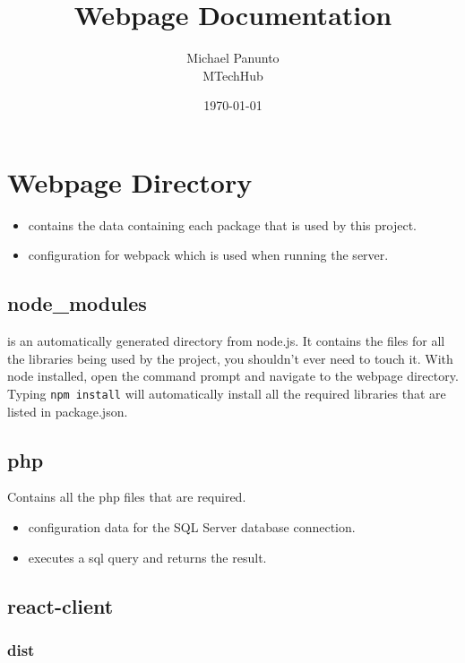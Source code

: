 \documentclass[12pt, titlepage, a4paper]{article}
\title{Webpage Documentation}
\author{
    Michael Panunto\\
    MTechHub
}
\date{\today}
\begin{document}
\maketitle
\newpage


\section{Webpage Directory}

\begin{itemize}
    \item {} contains the data containing each package that is used by this project. 
    \item {} configuration for webpack which is used when running the server.
\end{itemize}

\subsection{node\_modules}

 is an automatically generated directory from node.js. It contains the files for all the libraries being used by the project, you shouldn't ever need to touch it. With node installed, open the command prompt and navigate to the webpage directory. Typing \lstinline{npm install} will automatically install all the required libraries that are listed in package.json.

\subsection{php}

Contains all the php files that are required.

\begin{itemize}
    \item {} configuration data for the SQL Server database connection.
    \item {} executes a sql query and returns the result.
\end{itemize}

\subsection{react-client}
\subsubsection{dist}
\end{document}
